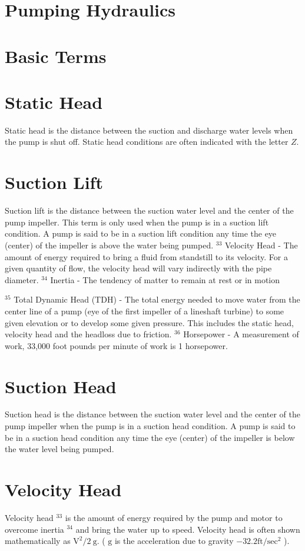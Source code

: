 \documentclass[10pt]{article}
\begin{document}
\section{Pumping Hydraulics}
\section{Basic Terms}
\section{Static Head}
Static head is the distance between the suction and discharge water levels when the pump is shut off. Static head conditions are often indicated with the letter $Z$.

\section{Suction Lift}
Suction lift is the distance between the suction water level and the center of the pump impeller. This term is only used when the pump is in a suction lift condition. A pump is said to be in a suction lift condition any time the eye (center) of the impeller is above the water being pumped. ${ }^{33}$ Velocity Head - The amount of energy required to bring a fluid from standstill to its velocity. For a given quantity of flow, the velocity head will vary indirectly with the pipe diameter. ${ }^{34}$ Inertia - The tendency of matter to remain at rest or in motion

${ }^{35}$ Total Dynamic Head (TDH) - The total energy needed to move water from the center line of a pump (eye of the first impeller of a lineshaft turbine) to some given elevation or to develop some given pressure. This includes the static head, velocity head and the headloss due to friction. ${ }^{36}$ Horsepower - A measurement of work, 33,000 foot pounds per minute of work is 1 horsepower.

\section{Suction Head}
Suction head is the distance between the suction water level and the center of the pump impeller when the pump is in a suction head condition. A pump is said to be in a suction head condition any time the eye (center) of the impeller is below the water level being pumped.

\section{Velocity Head}
Velocity head ${ }^{33}$ is the amount of energy required by the pump and motor to overcome inertia ${ }^{34}$ and bring the water up to speed. Velocity head is often shown mathematically as $\mathrm{V}^{2} / 2 \mathrm{~g}$. ( $\mathrm{g}$ is the acceleration due to gravity $-32.2 \mathrm{ft} / \mathrm{sec}^{2}$ ).
\end{document}
